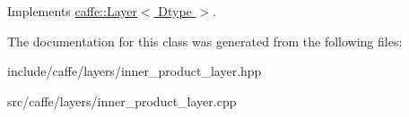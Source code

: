 Implements \hyperlink{classcaffe_1_1Layer_ad9d391b972c769c0ebee34ca6d1c973e}{caffe\+::\+Layer$<$ Dtype $>$}.



The documentation for this class was generated from the following files\+:\begin{DoxyCompactItemize}
\item 
include/caffe/layers/inner\+\_\+product\+\_\+layer.\+hpp\item 
src/caffe/layers/inner\+\_\+product\+\_\+layer.\+cpp\end{DoxyCompactItemize}
